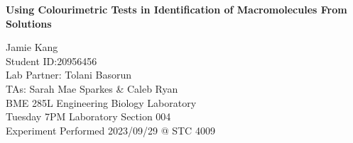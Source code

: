 \begin{titlepage}
    \begin{center}
        \vspace*{2in}
        \textbf{Using Colourimetric Tests in Identification of Macromolecules From Solutions}
 
        \vspace{0.5in}
        Jamie Kang\\
        Student ID:\@ 20956456\\
        Lab Partner: Tolani Basorun\\
        TAs: Sarah Mae Sparkes \& Caleb Ryan\\
        BME 285L Engineering Biology Laboratory\\
        Tuesday 7PM Laboratory Section 004\\
        Experiment Performed 2023/09/29 @ STC 4009\\
             
    \end{center}
 \end{titlepage}